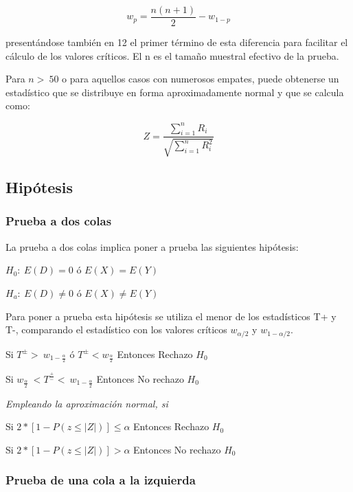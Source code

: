\documentclass[]{book}
\theoremstyle{definition}
\theoremstyle{definition}
\theoremstyle{definition}
\theoremstyle{remark}
\begin{document}
\[
w_{p} = \frac{n\left( n + 1 \right)}{2} - w_{1 - p}
\]

presentándose también en 12 el primer término de esta diferencia para
facilitar el cálculo de los valores críticos. El n es el tamaño muestral
efectivo de la prueba.

Para \(n > \ 50\) o para aquellos casos con numerosos empates, puede
obtenerse un estadístico que se distribuye en forma aproximadamente
normal y que se calcula como:

\[
Z = \frac{\sum_{i = 1}^{n}R_{i}}{\sqrt{\sum_{i = 1}^{n}R_{i}^{2}}}
\]

\hypertarget{hipotesis-1}{%
\subsection{Hipótesis}\label{hipotesis-1}}

\hypertarget{prueba-a-dos-colas-1}{%
\subsubsection{Prueba a dos colas}\label{prueba-a-dos-colas-1}}

La prueba a dos colas implica poner a prueba las siguientes hipótesis:

\(H_{0}:\ E(D) = 0\) ó \(E(X) = E(Y)\)

\(H_{a}:\ E\left( D \right) \neq 0\) ó \(E\left( X \right) \neq E(Y)\)

Para poner a prueba esta hipótesis se utiliza el menor de los
estadísticos T+ y T-, comparando el estadístico con los valores críticos
\(w_{\alpha/2}\) y \(w_{1 - \alpha/2}\).

Si \(T^{\pm} > \ w_{1 - \frac{\alpha}{2}}\) ó
\(T^{\pm} <w_{\frac{\alpha}{2}}\) Entonces Rechazo \(H_{0}\)

Si
\(w_{\frac{\alpha}{2}}\  < T^{\frac{+}{-}} < \ w_{1 - \frac{\alpha}{2}}\)
Entonces No rechazo \(H_{0}\)

\emph{Empleando la aproximación normal, si}

Si
\(2*\left\lbrack 1 - P\left( z \leq \left| Z \right| \right) \right\rbrack \leq \alpha\)
Entonces Rechazo \(H_{0}\)

Si
\(2*\left\lbrack 1 - P\left( z \leq \left| Z \right| \right) \right\rbrack > \alpha\)
Entonces No rechazo \(H_{0}\)

\hypertarget{prueba-de-una-cola-a-la-izquierda-1}{%
\subsubsection{Prueba de una cola a la
izquierda}\label{prueba-de-una-cola-a-la-izquierda-1}}
\end{document}

